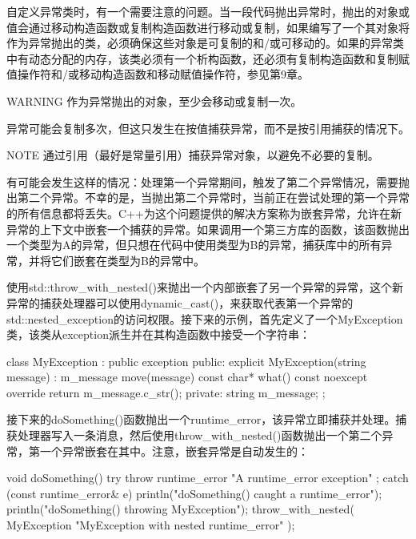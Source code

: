 自定义异常类时，有一个需要注意的问题。当一段代码抛出异常时，抛出的对象或值会通过移动构造函数或复制构造函数进行移动或复制，如果编写了一个其对象将作为异常抛出的类，必须确保这些对象是可复制的和/或可移动的。如果的异常类中有动态分配的内存，该类必须有一个析构函数，还必须有复制构造函数和复制赋值操作符和/或移动构造函数和移动赋值操作符，参见第9章。

\begin{myWarning}{WARNING}
作为异常抛出的对象，至少会移动或复制一次。
\end{myWarning}

异常可能会复制多次，但这只发生在按值捕获异常，而不是按引用捕获的情况下。

\begin{myNotic}{NOTE}
通过引用（最好是常量引用）捕获异常对象，以避免不必要的复制。
\end{myNotic}


有可能会发生这样的情况：处理第一个异常期间，触发了第二个异常情况，需要抛出第二个异常。不幸的是，当抛出第二个异常时，当前正在尝试处理的第一个异常的所有信息都将丢失。C++为这个问题提供的解决方案称为嵌套异常，允许在新异常的上下文中嵌套一个捕获的异常。如果调用一个第三方库的函数，该函数抛出一个类型为A的异常，但只想在代码中使用类型为B的异常，捕获库中的所有异常，并将它们嵌套在类型为B的异常中。

使用std::throw\_with\_nested()来抛出一个内部嵌套了另一个异常的异常，这个新异常的捕获处理器可以使用dynamic\_cast()，来获取代表第一个异常的std::nested\_exception的访问权限。接下来的示例，首先定义了一个MyException类，该类从exception派生并在其构造函数中接受一个字符串：

\begin{cpp}
class MyException : public exception
{
    public:
        explicit MyException(string message) : m_message { move(message) } {}
        const char* what() const noexcept override { return m_message.c_str(); }
    private:
        string m_message;
};
\end{cpp}

接下来的doSomething()函数抛出一个runtime\_error，该异常立即捕获并处理。捕获处理器写入一条消息，然后使用throw\_with\_nested()函数抛出一个第二个异常，第一个异常嵌套在其中。注意，嵌套异常是自动发生的：

\begin{cpp}
void doSomething()
{
    try {
        throw runtime_error { "A runtime_error exception" };
    } catch (const runtime_error& e) {
        println("doSomething() caught a runtime_error");
        println("doSomething() throwing MyException");
        throw_with_nested(
            MyException { "MyException with nested runtime_error" });
    }
}
\end{cpp}

